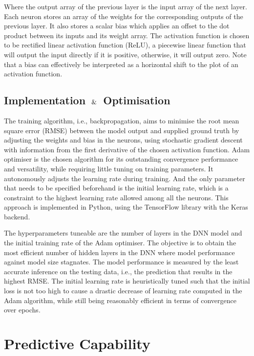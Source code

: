 \documentclass[11pt]{article}
\begin{document}
Where the output array of the previous layer is the input array of the next layer. Each neuron stores an array of the weights for the corresponding outputs of the previous layer. It also stores a scalar bias which applies an offset to the dot product between its inputs and its weight array. The activation function is chosen to be rectified linear activation function (ReLU), a piecewise linear function that will output the input directly if it is positive, otherwise, it will output zero. Note that a bias can effectively be interpreted as a horizontal shift to the plot of an activation function.

\subsection{Implementation $\And$ Optimisation}

The training algorithm, i.e., backpropagation, aims to minimise the root mean square error (RMSE) between the model output and supplied ground truth by adjusting the weights and bias in the neurons, using stochastic gradient descent with information from the first derivative of the chosen activation function. Adam optimiser \cite{Kingma2015} is the chosen algorithm for its outstanding convergence performance and versatility, while requiring little tuning on training parameters. It autonomously adjusts the learning rate during training. And the only parameter that needs to be specified beforehand is the initial learning rate, which is a constraint to the highest learning rate allowed among all the neurons. This approach is implemented in Python, using the TensorFlow \cite{tensorflow} library with the Keras \cite{Chollet2015} backend.

The hyperparameters tuneable are the number of layers in the DNN model and the initial training rate of the Adam optimiser. The objective is to obtain the most efficient number of hidden layers in the DNN where model performance against model size stagnates. The model performance is measured by the least accurate inference on the testing data, i.e., the prediction that results in the highest RMSE. The initial learning rate is heuristically tuned such that the initial loss is not too high to cause a drastic decrease of learning rate \cite{Reddi2018} computed in the Adam algorithm, while still being reasonably efficient in terms of convergence over epochs.

\section{Predictive Capability}
\end{document}
